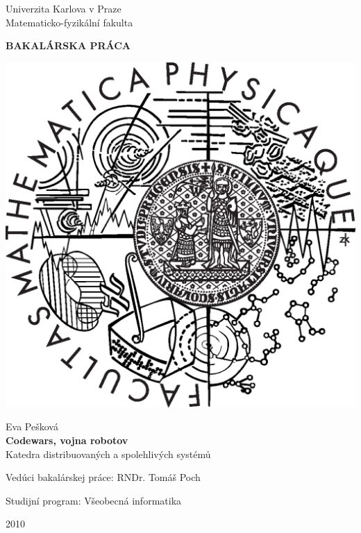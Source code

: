 \documentclass[12pt,notitlepage]{report}
\begin{document}
\begin{titlepage}
\begin{center}
\vspace{15mm}


\large
Univerzita Karlova v Praze\\
Matematicko-fyzikální fakulta\\


\vspace{5mm}


{\Large\bf BAKALÁRSKA PRÁCA}


\vspace{10mm}


\includegraphics[scale=0.3]{logo.eps} 


\vspace{15mm}


{\Large Eva Pešková}\\ %
\vspace{5mm}
{\Large\bf Codewars, vojna robotov }\\ %
\vspace{5mm}
Katedra distribuovaných a spolehlivých systémů
\vspace{15mm}


\large
\noindent Vedúci bakalárskej práce: RNDr. Tomáš Poch
\vspace{1mm} 


\noindent Studijní program: Všeobecná informatika %


\vspace{20mm}


2010
\end{center}
\end{titlepage}
\end{document}
